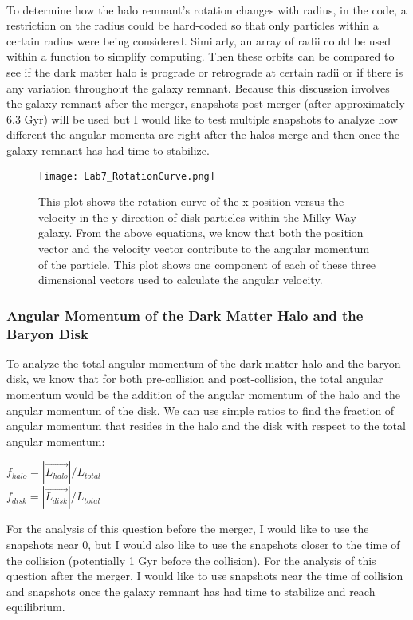\documentclass[linenumbers,trackchanges]{aastex7}
\begin{document}
\paragraph{} To determine how the halo remnant's rotation changes with radius, in the code, a restriction on the radius could be hard-coded so that only particles within a certain radius were being considered. Similarly, an array of radii could be used within a function to simplify computing. Then these orbits can be compared to see if the dark matter halo is prograde or retrograde at certain radii or if there is any variation throughout the galaxy remnant. Because this discussion involves the galaxy remnant after the merger, snapshots post-merger (after approximately 6.3 Gyr) will be used but I would like to test multiple snapshots to analyze how different the angular momenta are right after the halos merge and then once the galaxy remnant has had time to stabilize.

\begin{figure}[h!]
    \centering
    \texttt{[image: Lab7\_RotationCurve.png]}
    \caption{This plot shows the rotation curve of the x position versus the velocity in the y direction of disk particles within the Milky Way galaxy. From the above equations, we know that both the position vector and the velocity vector contribute to the angular momentum of the particle. This plot shows one component of each of these three dimensional vectors used to calculate the angular velocity.}
    \label{fig:Lab7RotationCurve}
\end{figure}

\subsubsection{Angular Momentum of the Dark Matter Halo and the Baryon Disk} To analyze the total angular momentum of the dark matter halo and the baryon disk, we know that for both pre-collision and post-collision, the total angular momentum would be the addition of the angular momentum of the halo and the angular momentum of the disk. We can use simple ratios to find the fraction of angular momentum that resides in the halo and the disk with respect to the total angular momentum:
\begin{center}
    $f_{halo} = |\vec{L_{halo}}| / L_{total}$
    \\$f_{disk} = |\vec{L_{disk}}| / L_{total}$
\end{center}
For the analysis of this question before the merger, I would like to use the snapshots near 0, but I would also like to use the snapshots closer to the time of the collision (potentially 1 Gyr before the collision). For the analysis of this question after the merger, I would like to use snapshots near the time of collision and snapshots once the galaxy remnant has had time to stabilize and reach equilibrium.
\end{document}
